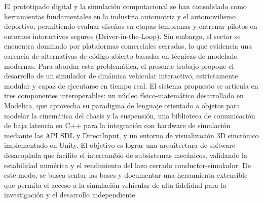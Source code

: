 El prototipado digital y la simulación computacional se han consolidado como herramientas fundamentales en la industria automotriz y el automovilismo deportivo, permitiendo evaluar diseños en etapas tempranas y entrenar pilotos en entornos interactivos seguros (Driver-in-the-Loop). Sin embargo, el sector se encuentra dominado por plataformas comerciales cerradas, lo que evidencia una carencia de alternativas de código abierto basadas en técnicas de modelado modernas. Para abordar esta problemática, el presente trabajo propone el desarrollo de un simulador de dinámica vehicular interactivo, estrictamente modular y capaz de ejecutarse en tiempo real. El sistema propuesto se articula en tres componentes interoperables: un núcleo físico-matemático desarrollado en Modelica, que aprovecha su paradigma de lenguaje orientado a objetos para modelar la cinemática del chasis y la suspensión, una biblioteca de comunicación de baja latencia en C++ para la integración con hardware de simulación mediante las API SDL y DirectInput, y un entorno de visualización 3D sincrónico implementado en Unity. El objetivo es lograr una arquitectura de software desacoplada que facilite el intercambio de subsistemas mecánicos, validando la estabilidad numérica y el rendimiento del lazo cerrado conductor-simulador. De este modo, se busca sentar las bases y documentar una herramienta extensible que permita el acceso a la simulación vehicular de alta fidelidad para la investigación y el desarrollo independiente.
